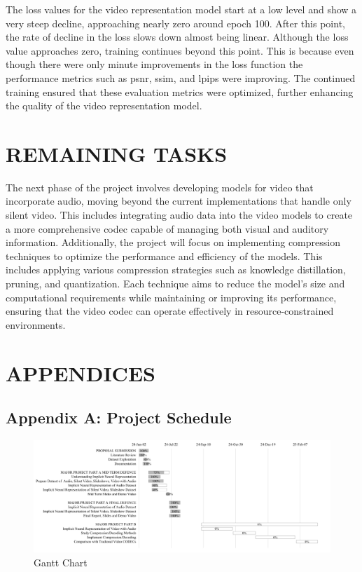 \documentclass{ioereport}
\begin{document}
    The loss values for the video representation model start at a low level and show a very steep decline, approaching nearly zero around epoch 100. After this point, the rate of decline in the loss slows down almost being linear. Although the loss value approaches zero, training continues beyond this point. This is because even though there were only minute improvements in the loss function the performance metrics such as \gls{psnr}, \gls{ssim}, and \gls{lpips} were improving. The continued training ensured that these evaluation metrics were optimized, further enhancing the quality of the video representation model.
    
    \pagebreak

\section{\MakeUppercase{Remaining Tasks}}
The next phase of the project involves developing models for video that incorporate audio, moving beyond the current implementations that handle only silent video. This includes integrating audio data into the video models to create a more comprehensive codec capable of managing both visual and auditory information. Additionally, the project will focus on implementing compression techniques to optimize the performance and efficiency of the models. This includes applying various compression strategies such as knowledge distillation, pruning, and quantization. Each technique aims to reduce the model's size and computational requirements while maintaining or improving its performance, ensuring that the video codec can operate effectively in resource-constrained environments.

\pagebreak


\section{\MakeUppercase{Appendices}}
    \subsection*{Appendix A: Project Schedule}
    \begin{figure}[H]
        \centering
        \includegraphics[angle=90, origin=c, height=0.6\textheight]{assets/Gantt.png}
        \caption{Gantt Chart}
        \label{fig:gantt}
    \end{figure}
    
\end{document}
